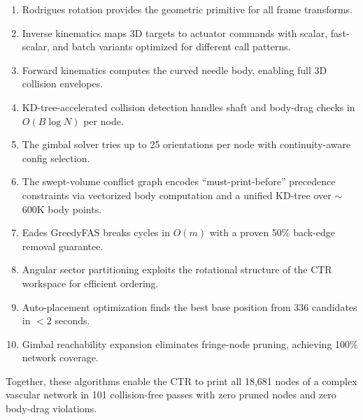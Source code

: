 \documentclass[11pt,a4paper]{article}
\begin{document}
\begin{enumerate}[nosep]
    \item Rodrigues rotation provides the geometric primitive for all frame transforms.
    \item Inverse kinematics maps 3D targets to actuator commands with scalar, fast-scalar, and batch variants optimized for different call patterns.
    \item Forward kinematics computes the curved needle body, enabling full 3D collision envelopes.
    \item KD-tree-accelerated collision detection handles shaft and body-drag checks in $O(B \log N)$ per node.
    \item The gimbal solver tries up to 25 orientations per node with continuity-aware config selection.
    \item The swept-volume conflict graph encodes ``must-print-before'' precedence constraints via vectorized body computation and a unified KD-tree over $\sim$600K body points.
    \item Eades GreedyFAS breaks cycles in $O(m)$ with a proven 50\% back-edge removal guarantee.
    \item Angular sector partitioning exploits the rotational structure of the CTR workspace for efficient ordering.
    \item Auto-placement optimization finds the best base position from 336 candidates in $<2$ seconds.
    \item Gimbal reachability expansion eliminates fringe-node pruning, achieving 100\% network coverage.
\end{enumerate}

Together, these algorithms enable the CTR to print all 18,681 nodes of a complex vascular network in 101 collision-free passes with zero pruned nodes and zero body-drag violations.
\end{document}
